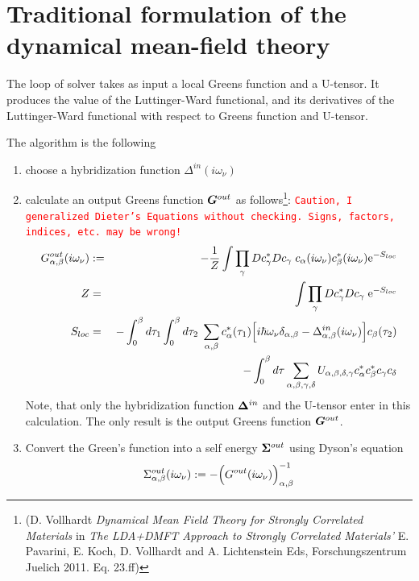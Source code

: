 \documentclass[11pt,a4paper]{report}
\newcommand{\petertt}[1]{\textcolor{red}{\texttt{#1}}}
\begin{document}
\chapter{Traditional formulation of the dynamical mean-field theory}
The loop of solver takes as input a local Greens function and a
U-tensor. It produces the value of the Luttinger-Ward functional, and
its derivatives of the Luttinger-Ward functional with respect to
Greens function and U-tensor.

The algorithm is the following
\begin{enumerate}
\item choose a hybridization function $\Delta^{in}(i\omega_\nu)$
\item calculate an output Greens function $\bm{G}^{out}$ as
  follows\footnote{(D. Vollhardt \textit{Dynamical Mean Field Theory
      for Strongly Correlated Materials} in \textit{The LDA+DMFT
      Approach to Strongly Correlated Materials'} E. Pavarini,
    E. Koch, D. Vollhardt and A. Lichtenstein Eds, Forschungszentrum
    Juelich 2011. Eq. 23.ff)}: \petertt{Caution, I
      generalized Dieter's Equations without checking. Signs, factors,
      indices, etc. may be wrong!}
\begin{eqnarray*}
G^{out}_{\alpha,\beta}(i\omega_\nu)&:=&
-\frac{1}{Z}\int\prod_{\gamma} Dc^*_\gamma Dc_\gamma\;
c_\alpha(i\omega_\nu)c^*_\beta(i\omega_\nu) \mathrm{e}^{-S_{loc}}
\\
Z&=&\int\prod_{\gamma} Dc^*_\gamma Dc_\gamma\;\mathrm{e}^{-S_{loc}}
\\
S_{loc}&=&-\int_0^\beta d\tau_1\int_0^\beta d\tau_2\;
\sum_{\alpha,\beta}c^*_\alpha(\tau_1)
\Bigl[
i\hbar\omega_\nu\delta_{\alpha,\beta}-\Delta^{in}_{\alpha,\beta}(i\omega_\nu)
\Bigr]
c_\beta(\tau_2)
\nonumber\\
&&-\int_0^\beta d\tau \sum_{\alpha,\beta,\gamma,\delta}
U_{\alpha,\beta,\delta,\gamma}
 c^*_\alpha c^*_\beta c_\gamma c_\delta
\end{eqnarray*}
Note, that only the hybridization function $\bm{\Delta}^{in}$ and the
  U-tensor enter in this calculation. The only result is the output
  Greens function $\bm{G}^{out}$.
%
\item Convert the Green's function into a self energy $\bm{\Sigma}^{out}$
  using Dyson's equation
\begin{eqnarray}
\Sigma^{out}_{\alpha,\beta}(i\omega_\nu)
:=-\Bigl(G^{out}(i\omega_\nu)\Bigr)^{-1}_{\alpha,\beta}

\end{eqnarray}
\end{enumerate}
\end{document}
